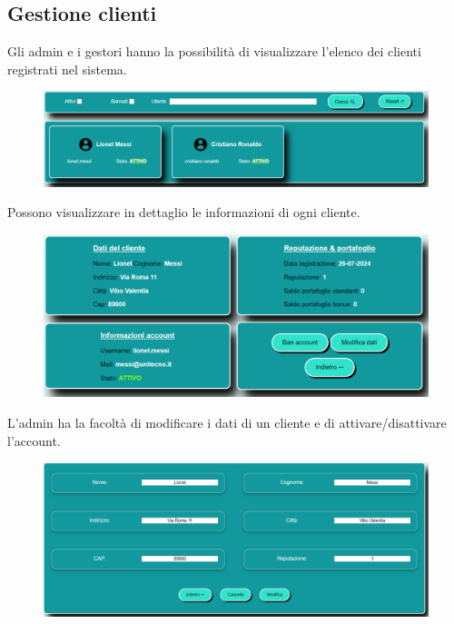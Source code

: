 \documentclass[a4paper, 14pt]{article}
\begin{document}
\begin{flushleft}
			\subsection{Gestione clienti}
				Gli admin e i gestori hanno la possibilità di visualizzare l'elenco dei clienti registrati nel sistema.
				\begin{figure}[H]
					\centering
					\includegraphics[width=\textwidth, frame=2pt]{"screenClienti.png"}	
				\end{figure}
				Possono visualizzare in dettaglio le informazioni di ogni cliente.
				\begin{figure}[H]
					\centering
					\includegraphics[width=\textwidth, frame=2pt]{"screenDettaglioCliente.png"}	
				\end{figure}
				L'admin ha la facoltà di modificare i dati di un cliente e di attivare/disattivare l'account.	
				\begin{figure}[H]
					\centering
					\includegraphics[width=\textwidth, frame=2pt]{"screenModificaCliente.png"}	
				\end{figure}
			

\end{flushleft}
\end{document}
